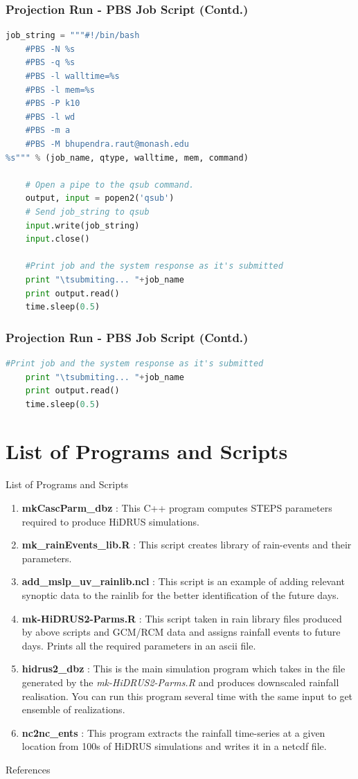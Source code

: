 \documentclass[aspectratio=169]{beamer}
\begin{document}
%
%
%
%
%
%
\begin{frame}[fragile]
\frametitle{Projection Run - PBS Job Script (Contd.)}
\begin{lstlisting}[language=Python]
 job_string = """#!/bin/bash
    #PBS -N %s
    #PBS -q %s
    #PBS -l walltime=%s
    #PBS -l mem=%s
    #PBS -P k10
    #PBS -l wd
    #PBS -m a
    #PBS -M bhupendra.raut@monash.edu
%s""" % (job_name, qtype, walltime, mem, command)
    
    # Open a pipe to the qsub command.
    output, input = popen2('qsub')
    # Send job_string to qsub
    input.write(job_string)
    input.close()
    
    #Print job and the system response as it's submitted
    print "\tsubmiting... "+job_name
    print output.read()
    time.sleep(0.5)
\end{lstlisting}

\end{frame}
%
%
%
%
%
%
\begin{frame}[fragile]
\frametitle{Projection Run - PBS Job Script (Contd.)}
\begin{lstlisting}[language=Python]
    #Print job and the system response as it's submitted
    print "\tsubmiting... "+job_name
    print output.read()
    time.sleep(0.5)
\end{lstlisting}

\end{frame}
%
%
%
%
%


\section{List of Programs and Scripts}
\begin{frame}{List of Programs and Scripts}
\begin{enumerate}
\item \textbf{mkCascParm\_dbz} : This C++ program computes STEPS parameters required to produce HiDRUS simulations.
\item \textbf{mk\_rainEvents\_lib.R} : This script creates library of rain-events and their parameters.

\item \textbf{add\_mslp\_uv\_rainlib.ncl} : This script is an example of adding relevant synoptic data to the rainlib for the better identification of the future days.
\item \textbf{mk-HiDRUS2-Parms.R} : This script taken in rain library files produced by above scripts and GCM/RCM data and assigns rainfall events to future days. Prints all the required parameters in an ascii file.
\item \textbf{hidrus2\_dbz} : This is the main simulation program which takes in the file generated by the \emph{mk-HiDRUS2-Parms.R} and produces downscaled rainfall realisation. You can run this program several time with the same input to get ensemble of realizations.
\item \textbf{nc2nc\_ents} : This program extracts the rainfall time-series at a given location from 100s of HiDRUS simulations and writes it in a netcdf file.

\end{enumerate}
\end{frame}

\begin{frame}{References}


\end{frame}
\end{document}
